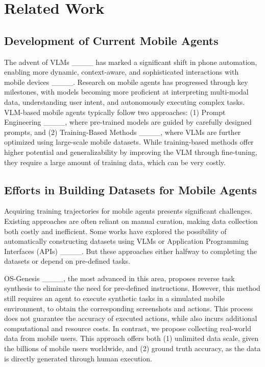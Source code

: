 \section{Related Work}
\vspace{-1mm}
\subsection{Development of Current Mobile Agents}
The advent of VLMs ____ has marked a significant shift in phone automation, enabling more dynamic, context-aware, and sophisticated interactions with mobile devices ____. Research on mobile agents has progressed through key milestones, with models becoming more proficient at interpreting multi-modal data, understanding user intent, and autonomously executing complex tasks. 
VLM-based mobile agents typically follow two approaches: (1) Prompt Engineering ____, where pre-trained models are guided by carefully designed prompts, and (2) Training-Based Methods ____, where VLMs are further optimized using large-scale mobile datasets. 
While training-based methods offer higher potential and generalizability by improving the VLM through fine-tuning, they require a large amount of training data, which can be very costly.

\vspace{-2mm}
\subsection{Efforts in Building Datasets for Mobile Agents}
Acquiring training trajectories for mobile agents presents significant challenges. 
Existing approaches are often reliant on manual curation, making data collection both costly and inefficient. Some works have explored the possibility of automatically constructing datasets using VLMs or Application Programming Interfaces (APIs) ____. 
But these approaches either halfway to completing the datasets or depend on pre-defined tasks.

OS-Genesis ____, the most advanced in this area, proposes reverse task synthesis to eliminate the need for pre-defined instructions. However, this method still requires an agent to execute synthetic tasks in a simulated mobile environment, to obtain the corresponding screenshots and actions. 
This process does not guarantee the accuracy of executed actions, while also incurs additional computational and resource costs.
In contrast, we propose collecting real-world data from mobile users. This approach offers both (1) unlimited data scale, given the billions of mobile users worldwide, and (2) ground truth accuracy, as the data is directly generated through human execution.




%